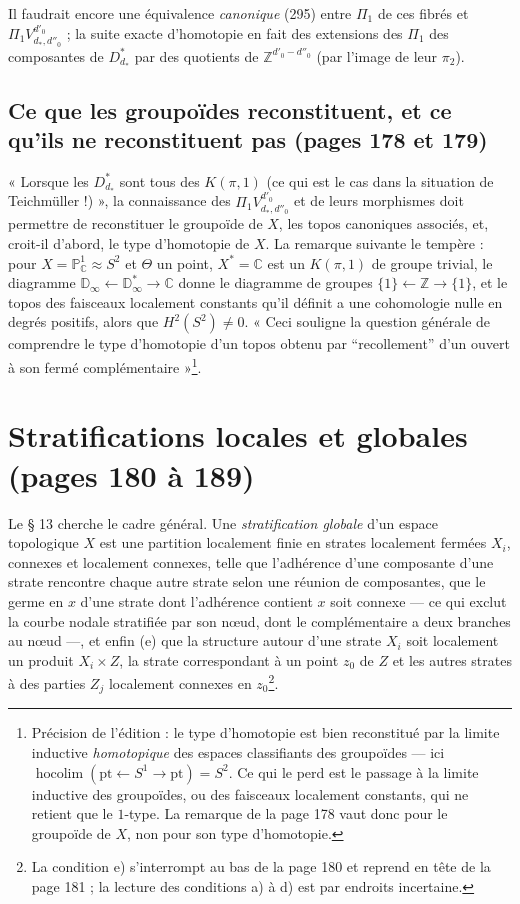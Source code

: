 \documentclass[11pt,a4paper]{article}
\begin{document}
Il faudrait encore une équivalence \emph{canonique} (295) entre $\Pi_1$ de ces
fibrés et $\Pi_1 V^{d'_0}_{d_*, d''_0}$ ; la suite exacte d'homotopie en fait des
extensions des $\Pi_1$ des composantes de $D^{*}_{d_*}$ par des quotients de
$\mathbb{Z}^{d'_0 - d''_0}$ (par l'image de leur $\pi_2$).

\subsection*{Ce que les groupoïdes reconstituent, et ce qu'ils ne reconstituent pas (pages 178 et 179)}

« Lorsque les $D^{*}_{d_*}$ sont tous des $K(\pi, 1)$ (ce qui est le cas dans la
situation de Teichmüller !) », la connaissance des $\Pi_1 V^{d'_0}_{d_*, d''_0}$ et
de leurs morphismes doit permettre de reconstituer le groupoïde de $X$, les
topos canoniques associés, et, croit-il d'abord, le type d'homotopie de $X$. La
remarque suivante le tempère : pour $X = \mathbb{P}^1_{\mathbb{C}} \approx S^2$ et
$\Theta$ un point, $X^* = \mathbb{C}$ est un $K(\pi, 1)$ de groupe trivial, le
diagramme $\mathbb{D}_\infty \leftarrow \mathbb{D}^{*}_\infty \rightarrow
\mathbb{C}$ donne le diagramme de groupes $\{1\} \leftarrow \mathbb{Z} \rightarrow
\{1\}$, et le topos des faisceaux localement constants qu'il définit a une
cohomologie nulle en degrés positifs, alors que $H^2(S^2) \neq 0$. « Ceci souligne
la question générale de comprendre le type d'homotopie d'un topos obtenu par
“recollement” d'un ouvert à son fermé complémentaire »\footnote{Précision de
l'édition : le type d'homotopie est bien reconstitué par la limite inductive
\emph{homotopique} des espaces classifiants des groupoïdes — ici
$\operatorname{hocolim}(\mathrm{pt} \leftarrow S^1 \rightarrow \mathrm{pt}) = S^2$.
Ce qui le perd est le passage à la limite inductive des groupoïdes, ou des
faisceaux localement constants, qui ne retient que le $1$-type. La remarque de la
page 178 vaut donc pour le groupoïde de $X$, non pour son type d'homotopie.}.

\section*{Stratifications locales et globales (pages 180 à 189)}

Le § 13 cherche le cadre général. Une \emph{stratification globale} d'un espace
topologique $X$ est une partition localement finie en strates localement fermées
$X_i$, connexes et localement connexes, telle que l'adhérence d'une composante
d'une strate rencontre chaque autre strate selon une réunion de composantes, que
le germe en $x$ d'une strate dont l'adhérence contient $x$ soit connexe — ce qui
exclut la courbe nodale stratifiée par son nœud, dont le complémentaire a deux
branches au nœud —, et enfin (e) que la structure autour d'une strate $X_i$ soit
localement un produit $X_i \times Z$, la strate correspondant à un point $z_0$ de
$Z$ et les autres strates à des parties $Z_j$ localement connexes en
$z_0$\footnote{La condition e) s'interrompt au bas de la page 180 et reprend en
tête de la page 181 ; la lecture des conditions a) à d) est par endroits
incertaine.}.
\end{document}
